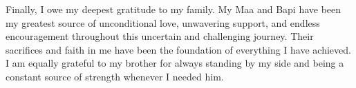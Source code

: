 Finally, I owe my deepest gratitude to my family. My Maa and Bapi have been my greatest source of unconditional love, unwavering support, and endless encouragement throughout this uncertain and challenging journey. Their sacrifices and faith in me have been the foundation of everything I have achieved. I am equally grateful to my brother for always standing by my side and being a constant source of strength whenever I needed him.

